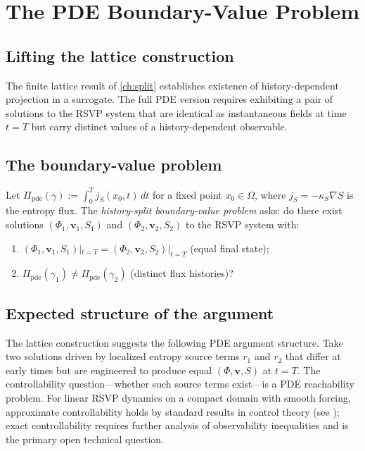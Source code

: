 \documentclass[12pt, oneside]{memoir}
\newcommand{\bv}{\mathbf{v}}
\begin{document}
\chapter{The PDE Boundary-Value Problem}
\label{ch:pde}

\section{Lifting the lattice construction}

The finite lattice result of \cref{ch:split} establishes existence of history-dependent
projection in a surrogate.  The full PDE version requires exhibiting a pair of solutions
to the RSVP system  that are identical as instantaneous fields
at time $t = T$ but carry distinct values of a history-dependent observable.

\section{The boundary-value problem}

\begin{definition}
\label{def:bvp}
Let $\Pi_{\mathrm{pde}}(\gamma) := \int_0^T j_S(x_0, t)\, dt$ for a fixed point $x_0 \in
\Omega$, where $j_S = -\kappa_S \nabla S$ is the entropy flux.  The
\emph{history-split boundary-value problem} asks: do there exist solutions
$(\Phi_1, \bv_1, S_1)$ and $(\Phi_2, \bv_2, S_2)$ to the RSVP system with:
\begin{enumerate}
  \item $(\Phi_1, \bv_1, S_1)|_{t=T} = (\Phi_2, \bv_2, S_2)|_{t=T}$ (equal final state);
  \item $\Pi_{\mathrm{pde}}(\gamma_1) \ne \Pi_{\mathrm{pde}}(\gamma_2)$ (distinct flux histories)?
\end{enumerate}
\end{definition}

\section{Expected structure of the argument}

The lattice construction suggests the following PDE argument structure.  Take two
solutions driven by localized entropy source terms $r_1$ and $r_2$ that differ at early
times but are engineered to produce equal $(\Phi, \bv, S)$ at $t = T$.  The
controllability question---whether such source terms exist---is a PDE reachability
problem.  For linear RSVP dynamics on a compact domain with smooth forcing, approximate
controllability holds by standard results in control theory (see
\cite{lions1988,zuazua2007}); exact controllability requires further analysis of
observability inequalities and is the primary open technical question.
\end{document}
